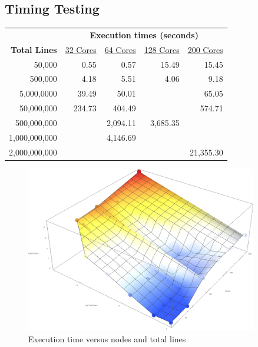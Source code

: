 

%
%

\subsection{Timing Testing}


\begin{tabular}{r r r r r}
 & \multicolumn{4}{c}{\textbf{Execution times (seconds)}} \\
\textbf{Total Lines} & \underline{32 Cores} & \underline{64 Cores} & \underline{128 Cores} & \underline{200 Cores} \\
       50,000 &   0.55 &     0.57 &     15.49 & 15.45 \\
      500,000 &   4.18 &     5.51 &      4.06 & 9.18 \\
   5,000,0000 &  39.49 &    50.01 &           & 65.05 \\
   50,000,000 & 234.73 &   404.49 &           & 574.71 \\
  500,000,000 &        & 2,094.11 &  3,685.35 & \\
1,000,000,000 &        & 4,146.69 &           &  \\
2,000,000,000 &        &          &           & 21,355.30 \\ 
\end{tabular}

\begin{figure}
\includegraphics[width=0.9\textwidth]{./images/runtimes.png}
\caption{Execution time versus nodes and total lines}
\end{figure}


